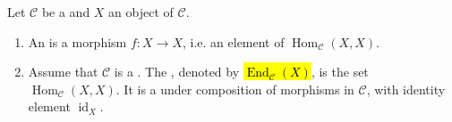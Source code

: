 \begin{definition} \label{definition:endomorphism_of_an_object_of_a_category_endomorphism_monoid_of_an_object_of_a_locally_small_category}
    Let $\mathcal{C}$ be a  and $X$ an object of $\mathcal{C}$.
    \begin{enumerate}
        \item An  is a morphism $f: X \to X$, i.e. an element of $\operatorname{Hom}_{\mathcal{C}}(X,X)$.

        \item Assume that $\mathcal{C}$ is a . The , denoted by \hl{$\operatorname{End}_{\mathcal{C}}(X)$}, is the set $\operatorname{Hom}_{\mathcal{C}}(X,X)$. It is a  under composition of morphisms in $\mathcal{C}$, with identity element $\operatorname{id}_X$.
    \end{enumerate}
\end{definition}
